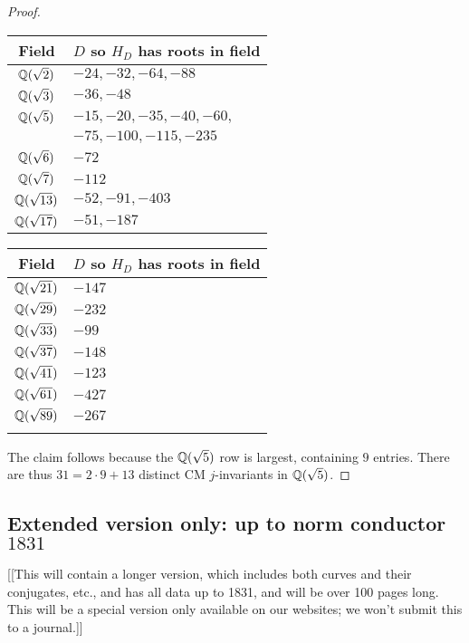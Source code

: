 \documentclass{amsart}
\begin{document}
\begin{proof}
\begin{center}
\begin{tabular}{|c|l|}\hline
Field & $D$ so $H_D$ has roots in field\\\hline
$\mathbb{Q}(\sqrt{2})$ & $-24,-32,-64,-88$ \\\hline
$\mathbb{Q}(\sqrt{3})$ & $-36,-48$ \\\hline
$\mathbb{Q}(\sqrt{5})$ & $-15,-20,-35,-40,-60,$ \\
             & $-75,-100,-115,-235$\\\hline
$\mathbb{Q}(\sqrt{6})$ & $-72$ \\\hline
$\mathbb{Q}(\sqrt{7})$ & $-112$ \\\hline
$\mathbb{Q}(\sqrt{13})$ & $-52,-91,-403$ \\\hline
$\mathbb{Q}(\sqrt{17})$ & $-51,-187$ \\\hline
\end{tabular}
\begin{tabular}{|c|l|}\hline
Field & $D$ so $H_D$ has roots in field\\\hline
$\mathbb{Q}(\sqrt{21})$ & $-147$ \\\hline
$\mathbb{Q}(\sqrt{29})$ & $-232$ \\\hline
$\mathbb{Q}(\sqrt{33})$ & $-99$ \\\hline
$\mathbb{Q}(\sqrt{37})$ & $-148$ \\\hline
$\mathbb{Q}(\sqrt{41})$ & $-123$ \\\hline
$\mathbb{Q}(\sqrt{61})$ & $-427$ \\\hline
$\mathbb{Q}(\sqrt{89})$ & $-267$ \\\hline
& \\\hline
\end{tabular}
\end{center}
The claim follows because the $\mathbb{Q}(\sqrt{5})$ row is largest,
containing $9$ entries.  There are thus $31 = 2\cdot 9 + 13$ distinct CM $j$-invariants
in $\mathbb{Q}(\sqrt{5})$.

\end{proof}




\subsection{Extended version only: up to norm conductor  $1831$}\label{sec:to1831}

[[This will contain a longer version, which includes both curves and
their conjugates, etc., and has all data up to 1831, and will be over
100 pages long.  This will be a special version only available on our
websites; we won't submit this to a journal.]]



 

\end{document}
